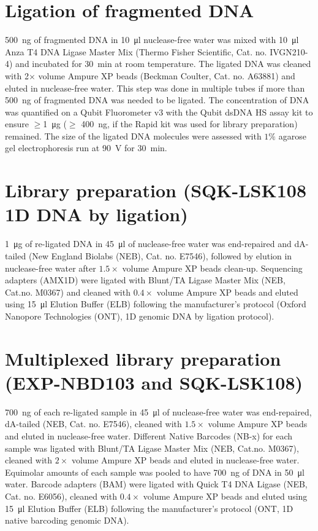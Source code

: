 \section*{Ligation of fragmented DNA}
\SI{500}{\nano\gram} of fragmented DNA in \SI{10}{\micro\litre}
nuclease-free water was mixed with \SI{10}{\micro\litre} Anza T4 DNA
Ligase Master Mix (Thermo Fisher Scientific, Cat. no. IVGN210-4) and
incubated for \SI{30}{\minute} at room temperature. The ligated DNA was
cleaned with 2\(\times\) volume Ampure XP beads (Beckman Coulter, Cat.
no. A63881) and eluted in nuclease-free water. This step was done in
multiple tubes if more than \SI{500}{\nano\gram} of fragmented DNA was
needed to be ligated. The concentration of DNA was quantified on a Qubit
Fluorometer v3 with the Qubit dsDNA HS assay kit to ensure
\(\geq\)\SI{1}{\micro\gram} (\(\geq\) \SI{400}{\nano\gram}, if the Rapid
kit was used for library preparation) remained. The size of the ligated
DNA molecules were assessed with \(1\%\) agarose gel electrophoresis run
at \SI{90}{\volt} for \SI{30}{\minute}.

\section*{Library preparation (SQK-LSK108 1D DNA by ligation)}
\SI{1}{\micro\gram} of re-ligated DNA in \SI{45}{\micro\litre} of
nuclease-free water was end-repaired and dA-tailed (New England Biolabs
(NEB), Cat. no. E7546), followed by elution in nuclease-free water after
\(1.5\times\) volume Ampure XP beads clean-up. Sequencing adapters
(AMX1D) were ligated with Blunt/TA Ligase Master Mix (NEB, Cat.no.
M0367) and cleaned with \(0.4\times\) volume Ampure XP beads and eluted
using \SI{15}{\micro\litre} Elution Buffer (ELB) following the
manufacturer's protocol (Oxford Nanopore Technologies (ONT), 1D genomic
DNA by ligation protocol).

\section*{Multiplexed library preparation (EXP-NBD103 and SQK-LSK108)}
\SI{700}{\nano\gram} of each re-ligated sample in \SI{45}{\micro\litre}
of nuclease-free water was end-repaired, dA-tailed (NEB, Cat. no.
E7546), cleaned with \(1.5\times\) volume Ampure XP beads and eluted in
nuclease-free water. Different Native Barcodes (NB-x) for each sample
was ligated with Blunt/TA Ligase Master Mix (NEB, Cat.no. M0367),
cleaned with \(2\times\) volume Ampure XP beads and eluted in
nuclease-free water. Equimolar amounts of each sample was pooled to have
\SI{700}{\nano\gram} of DNA in \SI{50}{\micro\litre} water. Barcode
adapters (BAM) were ligated with Quick T4 DNA Ligase (NEB, Cat. no.
E6056), cleaned with \(0.4\times\) volume Ampure XP beads and eluted
using \SI{15}{\micro\litre} Elution Buffer (ELB) following the
manufacturer's protocol (ONT, 1D native barcoding genomic DNA).

